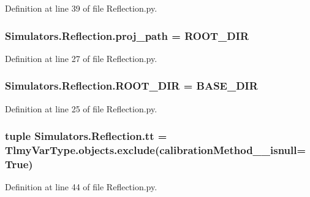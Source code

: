 Definition at line 39 of file Reflection.\+py.

\hypertarget{namespace_simulators_1_1_reflection_ae6bb432004b1bbdb718f64f77c7538e3}{}
\subsubsection[{proj\+\_\+path}]{\setlength{\rightskip}{0pt plus 5cm}Simulators.\+Reflection.\+proj\+\_\+path = {\bf R\+O\+O\+T\+\_\+\+D\+I\+R}}\label{namespace_simulators_1_1_reflection_ae6bb432004b1bbdb718f64f77c7538e3}


Definition at line 27 of file Reflection.\+py.

\hypertarget{namespace_simulators_1_1_reflection_a728f4dae871184e90c6d7dd3a693a53e}{}
\subsubsection[{R\+O\+O\+T\+\_\+\+D\+I\+R}]{\setlength{\rightskip}{0pt plus 5cm}Simulators.\+Reflection.\+R\+O\+O\+T\+\_\+\+D\+I\+R = B\+A\+S\+E\+\_\+\+D\+I\+R}\label{namespace_simulators_1_1_reflection_a728f4dae871184e90c6d7dd3a693a53e}


Definition at line 25 of file Reflection.\+py.

\hypertarget{namespace_simulators_1_1_reflection_a67aec4ca0b1d15b76e83183c3e61675e}{}
\subsubsection[{tt}]{\setlength{\rightskip}{0pt plus 5cm}tuple Simulators.\+Reflection.\+tt = Tlmy\+Var\+Type.\+objects.\+exclude(calibration\+Method\+\_\+\+\_\+isnull=True)}\label{namespace_simulators_1_1_reflection_a67aec4ca0b1d15b76e83183c3e61675e}


Definition at line 44 of file Reflection.\+py.

